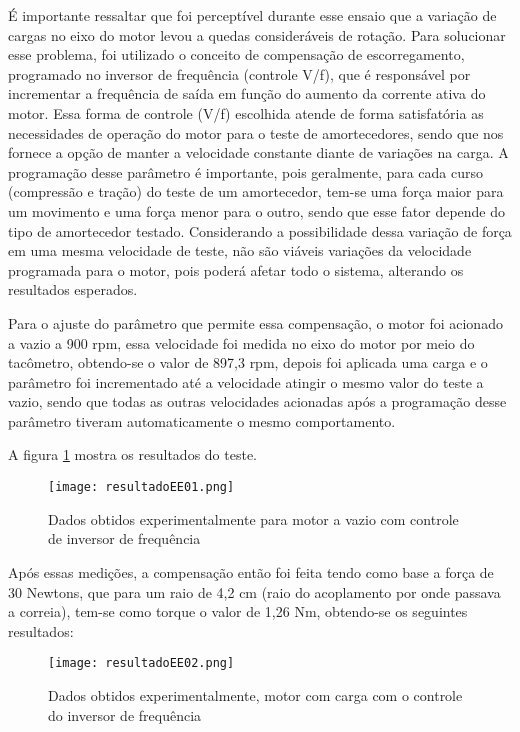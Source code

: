 			É importante ressaltar que foi perceptível durante esse ensaio que a variação de cargas no eixo do motor levou a quedas consideráveis de rotação. Para solucionar esse problema, foi utilizado o conceito de compensação de escorregamento, programado no inversor de frequência (controle V/f), que é responsável por incrementar a frequência de saída em função do aumento da corrente ativa do motor. Essa forma de controle (V/f) escolhida atende de forma satisfatória as necessidades de operação do motor para o teste de amortecedores, sendo que nos fornece a opção de manter a velocidade constante diante de variações na carga.  A programação desse parâmetro é importante, pois geralmente, para cada curso (compressão e tração) do teste de um amortecedor, tem-se uma força maior para um movimento e uma força menor para o outro, sendo que esse fator depende do tipo de amortecedor testado. Considerando a possibilidade dessa variação de força em uma mesma velocidade de teste, não são viáveis variações da velocidade programada para o motor, pois poderá afetar todo o sistema, alterando os resultados esperados.
			
			Para o ajuste do parâmetro que permite essa compensação, o motor foi acionado a vazio a 900 rpm, essa velocidade foi medida no eixo do motor por meio do tacômetro, obtendo-se o valor de 897,3 rpm, depois foi aplicada uma carga e o parâmetro foi incrementado até a velocidade atingir o mesmo valor do teste a vazio, sendo que todas as outras velocidades acionadas após a programação desse parâmetro tiveram automaticamente o mesmo comportamento.

			A figura \ref{resultadoEE01} mostra os resultados do teste.

			\newpage
 			\begin{figure}[!h]
				\centering
				\texttt{[image: resultadoEE01.png]}
				\caption[Dados obtidos experimentalmente para motor a vazio com controle de inversor de frequência]{Dados obtidos experimentalmente para motor a vazio com controle de inversor de frequência} 
				\label{resultadoEE01}
			\end{figure}

			Após essas medições, a compensação então foi feita tendo como base a força de 30 Newtons, que para um raio de 4,2 cm (raio do acoplamento por onde passava a correia), tem-se como torque o valor de 1,26 Nm, obtendo-se os seguintes resultados:

			\begin{figure}[!h]
				\centering
				\texttt{[image: resultadoEE02.png]}
				\caption[Dados obtidos experimentalmente, motor com carga com o controle do inversor de frequência]{Dados obtidos experimentalmente, motor com carga com o controle do inversor de frequência} 
				\label{resultadoEE02}
			\end{figure}

